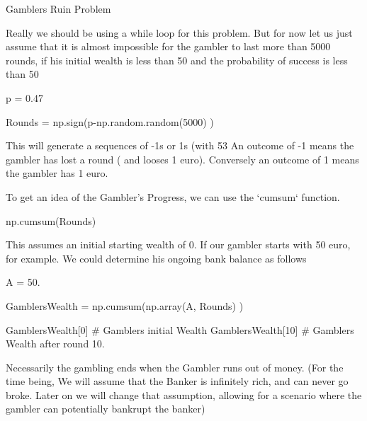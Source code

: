 
Gamblers Ruin Problem

Really we should be using a while loop for this problem. But for now let us just assume that it is almost impossible
for the gambler to last more than 5000 rounds, if his initial wealth is less than 50 and the probability of success is less than 50%

p = 0.47

Rounds = np.sign(p-np.random.random(5000) ) 


This will generate a sequences of -1s or 1s (with 53%
An outcome of -1 means the gambler has lost a round ( and looses 1 euro). Conversely an outcome of 1 means the gambler has 1 euro.

To get an idea of the Gambler's Progress, we can use the `cumsum` function.

np.cumsum(Rounds)

This assumes an initial starting wealth of 0. If our gambler starts with 50 euro, for example. We could determine his ongoing bank balance as follows

A = 50.

GamblersWealth = np.cumsum(np.array(A, Rounds) )

GamblersWealth[0]  #  Gamblers initial Wealth
GamblersWealth[10] #  Gamblers Wealth after round 10.

Necessarily the gambling ends when the Gambler runs out of money. 
(For the time being, We will assume  that the Banker is infinitely rich, and can never go broke. Later on we will change that assumption, allowing for a scenario 
where the gambler can potentially bankrupt the banker)
 
